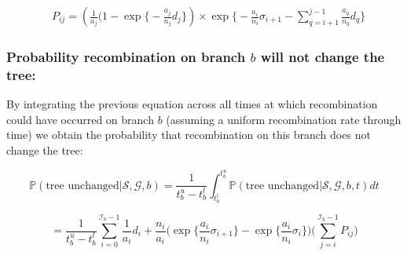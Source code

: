 \documentclass[11pt]{article}
\begin{document}
\begin{equation}
\begin{aligned}
	&P_{ij} = 
	\left( \frac{1}{a_j} (1 - \exp \bigg\{ -\frac{a_j}{n_j} d_j \bigg\} \right)
	\times
	\exp \bigg\{ -\frac{a_i}{n_i}\sigma_{i+1} - 
	\sum_{q=i+1}^{j-1} \frac{a_q}{n_q} d_q \bigg \}
\end{aligned}
\end{equation}



\subsubsection{Probability recombination on branch $b$ will not change the tree:}
By integrating the previous equation across all times at which recombination could
have occurred on branch $b$ (assuming a uniform recombination rate through time) 
we obtain the probability that recombination on this branch does not change the tree:

\begin{equation*}
	\mathbb{P}(\textrm{tree unchanged} | \mathcal{S},\mathcal{G},b) = 
	\frac{1}{t^u_b-t^l_b} \int_{t_b^l}^{t_b^u} 
	\mathbb{P}(\textrm{tree unchanged} | \mathcal{S},\mathcal{G},b,t)dt
\end{equation*}

\begin{equation}
	= \frac{1}{t^u_b - t^l_b}
	\sum_{i=0}^{\mathcal{I}_b-1} \frac{1}{a_i} d_i + 
	\frac{n_i}{a_i} 
	\bigg(
		\exp\bigg\{\frac{a_i}{n_i}\sigma_{i+1}\bigg\} - 
		\exp\bigg\{\frac{a_i}{n_i}\sigma_i\bigg\}
	\bigg)
	\bigg(\sum_{j=i}^{\mathcal{I}_b-1}P_{ij}\bigg)
\end{equation}
\end{document}
